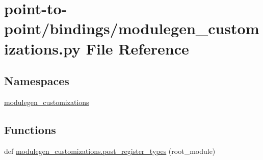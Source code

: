 \hypertarget{point-to-point_2bindings_2modulegen__customizations_8py}{}\section{point-\/to-\/point/bindings/modulegen\+\_\+customizations.py File Reference}
\label{point-to-point_2bindings_2modulegen__customizations_8py}
\subsection*{Namespaces}
\begin{DoxyCompactItemize}
\item 
 \hyperlink{namespacemodulegen__customizations}{modulegen\+\_\+customizations}
\end{DoxyCompactItemize}
\subsection*{Functions}
\begin{DoxyCompactItemize}
\item 
def \hyperlink{namespacemodulegen__customizations_a752cb066e8de8ee88028481335101ec9}{modulegen\+\_\+customizations.\+post\+\_\+register\+\_\+types} (root\+\_\+module)
\end{DoxyCompactItemize}
